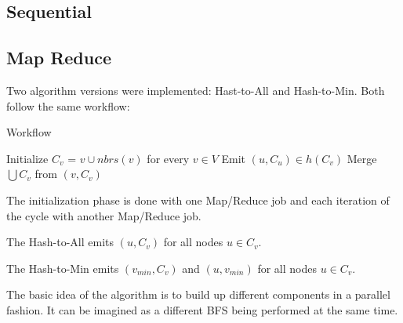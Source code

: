 \subsection{Sequential}

\subsection{Map Reduce}

Two algorithm versions were implemented: Hast-to-All and Hash-to-Min. Both follow the same workflow:

\begin{algorithm}
\caption{Workflow}
\label{algo:workflow}
\begin{algorithmic}[1]
\State Initialize $C_{v}$ = ${v} \cup nbrs(v)$ for every $v \in V$
\Repeat
\State Emit $(u, C_u) \in h(C_ v)$
\State Merge $\bigcup C_v$ from $(v, C_v)$
\end{algorithmic}
\end{algorithm}

The initialization phase is done with one Map/Reduce job and each iteration of the cycle with another Map/Reduce job.

The Hash-to-All emits $(u, C_v)$ for all nodes $u \in C_v$.

The Hash-to-Min emits $(v_{min}, C_v)$ and $(u, v_{min})$ for all nodes $u \in C_v$.

The basic idea of the algorithm is to build up different components in a parallel fashion. It can be imagined as a different BFS being performed at the same time.

